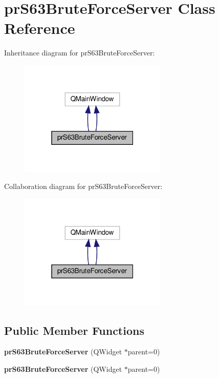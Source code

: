 \hypertarget{classpr_s63_brute_force_server}{}\section{pr\+S63\+Brute\+Force\+Server Class Reference}
\label{classpr_s63_brute_force_server}


Inheritance diagram for pr\+S63\+Brute\+Force\+Server\+:\nopagebreak
\begin{figure}[H]
\begin{center}
\leavevmode
\includegraphics[width=199pt]{classpr_s63_brute_force_server__inherit__graph}
\end{center}
\end{figure}


Collaboration diagram for pr\+S63\+Brute\+Force\+Server\+:\nopagebreak
\begin{figure}[H]
\begin{center}
\leavevmode
\includegraphics[width=199pt]{classpr_s63_brute_force_server__coll__graph}
\end{center}
\end{figure}
\subsection*{Public Member Functions}
\begin{DoxyCompactItemize}
\item 
\mbox{\label{classpr_s63_brute_force_server_a9a2fb54eccec9ea1687a2c8938e1cd28}} 
{\bfseries pr\+S63\+Brute\+Force\+Server} (Q\+Widget $\ast$parent=0)
\item 
\mbox{\label{classpr_s63_brute_force_server_a9a2fb54eccec9ea1687a2c8938e1cd28}} 
{\bfseries pr\+S63\+Brute\+Force\+Server} (Q\+Widget $\ast$parent=0)
\end{DoxyCompactItemize}


